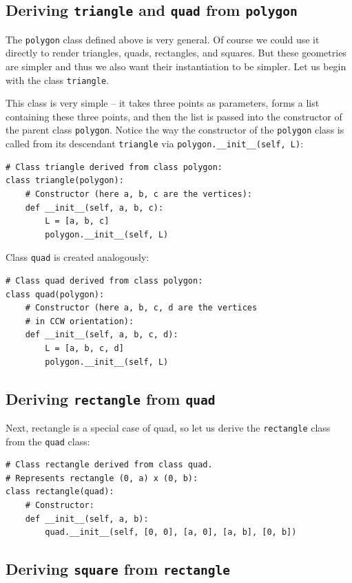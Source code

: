 \subsection{Deriving {\tt triangle} and {\tt quad} from {\tt polygon}}

The {\tt polygon} class defined above is very general. Of course we could use 
it directly to render triangles, quads, rectangles, and squares. But these 
geometries are simpler and thus we also want their instantiation to be simpler.  
Let us begin with the class {\tt triangle}. 

This class is very simple -- it takes three points as parameters, forms 
a list containing these three points, and then the list is passed into the 
constructor of the parent class {\tt polygon}. Notice the way the constructor of
the {\tt polygon} class is called from its descendant {\tt triangle} via 
{\tt polygon.\_\_init\_\_(self, L)}:

\begin{verbatim}
# Class triangle derived from class polygon:
class triangle(polygon):
    # Constructor (here a, b, c are the vertices):
    def __init__(self, a, b, c):
        L = [a, b, c]
        polygon.__init__(self, L)
\end{verbatim}
Class {\tt quad} is created analogously:

\begin{verbatim}
# Class quad derived from class polygon:
class quad(polygon):
    # Constructor (here a, b, c, d are the vertices
    # in CCW orientation):
    def __init__(self, a, b, c, d):
        L = [a, b, c, d]
        polygon.__init__(self, L)
\end{verbatim}

\subsection{Deriving {\tt rectangle} from {\tt quad}}

Next, rectangle is a special case of quad, so let us derive the 
{\tt rectangle} class from the {\tt quad} class:

\begin{verbatim}
# Class rectangle derived from class quad.
# Represents rectangle (0, a) x (0, b):
class rectangle(quad):
    # Constructor:
    def __init__(self, a, b):
        quad.__init__(self, [0, 0], [a, 0], [a, b], [0, b])
\end{verbatim}

\subsection{Deriving {\tt square} from {\tt rectangle}}

